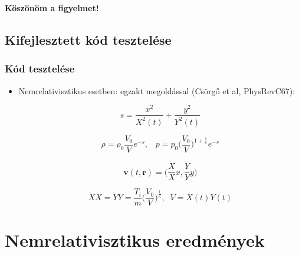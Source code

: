 \documentclass{beamer}
\begin{document}
\section{}
\begin{frame}
\begin{center}
\textbf{\huge{Köszönöm a figyelmet!}}
\end{center}
\end{frame}




\subsection{Kifejlesztett kód tesztelése}
\begin{frame}[noframenumbering]
\frametitle{Kód tesztelése}
\begin{itemize}
  \setlength{\itemsep}{5pt}
\item<1| only@1> Nemrelativisztikus esetben: egzakt megoldással (Csörgő et al, PhysRevC67):

\begin{equation*}
s=\frac{x^2}{X^2(t)}+\frac{y^2}{Y^2(t)}
\end{equation*}

\begin{equation*}
\rho = \rho_0\frac{V_0}{V}e^{-s},\;\;\; p=p_0\bigg(\frac{V_0}{V}\bigg)^{1+\frac{1}{\kappa}}e^{-s}
\end{equation*}

\begin{equation*}
\bm{v}(t, \bm{r})=\bigg(\frac{\dot{X}}{X}x, \frac{\dot{Y}}{Y}y\bigg)
\end{equation*}

\begin{equation*}
\ddot{X}X=\ddot{Y}Y=\frac{T_i}{m}\bigg(\frac{V_0}{V}\bigg)^{\frac{1}{\kappa}},\;\;V=X(t)Y(t)
\end{equation*}
\end{itemize}
\end{frame}







\section{Nemrelativisztikus eredmények}
\end{document}
